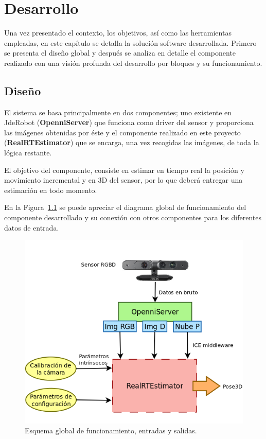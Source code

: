 
\chapter{Desarrollo}

\label{Chapter4} %

Una vez presentado el contexto, los objetivos, así como las herramientas empleadas, en este capítulo se detalla la solución software desarrollada. Primero se presenta el diseño global y después se analiza en detalle el componente realizado con una visión profunda del desarrollo por bloques y su funcionamiento.


\section{Diseño}

El sistema se basa principalmente en dos componentes; uno existente en JdeRobot (\textbf{OpenniServer}) que funciona como driver del sensor y proporciona las imágenes obtenidas por éste y el componente realizado en este proyecto (\textbf{RealRTEstimator}) que se encarga, una vez recogidas las imágenes, de toda la lógica restante.

El objetivo del componente, consiste en estimar en tiempo real la posición y movimiento incremental y en 3D del sensor, por lo que deberá entregar una estimación en todo momento.

En la Figura~\ref{fig:diagram1} se puede apreciar el diagrama global de funcionamiento del componente desarrollado y su conexión con otros componentes para los diferentes datos de entrada.

\begin{figure}[th]
\centering
\includegraphics[scale=0.4]{Figures/diagram1.png}
\decoRule
\caption[Esquema general del componente RealRTEstimator]{Esquema global de funcionamiento, entradas y salidas.}
\label{fig:diagram1}
\end{figure}

